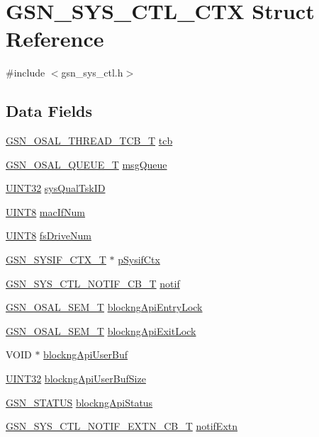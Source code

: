 \hypertarget{a00248}{
\section{GSN\_\-SYS\_\-CTL\_\-CTX Struct Reference}
\label{a00248}
}


{\ttfamily \#include $<$gsn\_\-sys\_\-ctl.h$>$}

\subsection*{Data Fields}
\begin{DoxyCompactItemize}
\item 
\hyperlink{a00628_ga43c1eefe78fa26e478301976f96ac31f}{GSN\_\-OSAL\_\-THREAD\_\-TCB\_\-T} \hyperlink{a00248_afe071d7dcf0fdfb6314fefc4b6f663df}{tcb}
\item 
\hyperlink{a00628_gaebe1c924d01bf6607bd65961bf134095}{GSN\_\-OSAL\_\-QUEUE\_\-T} \hyperlink{a00248_a3525baeed8d9f795ed0c44437f548da2}{msgQueue}
\item 
\hyperlink{a00660_gae1e6edbbc26d6fbc71a90190d0266018}{UINT32} \hyperlink{a00248_a3e06cb8fa58f49b7004a85c6f387ddc7}{sysQualTskID}
\item 
\hyperlink{a00660_gab27e9918b538ce9d8ca692479b375b6a}{UINT8} \hyperlink{a00248_ae57ae92e651751e7978e237c55133b4c}{macIfNum}
\item 
\hyperlink{a00660_gab27e9918b538ce9d8ca692479b375b6a}{UINT8} \hyperlink{a00248_a608e9ec21e3e188328d47a7bba1483ec}{fsDriveNum}
\item 
\hyperlink{a00261}{GSN\_\-SYSIF\_\-CTX\_\-T} $\ast$ \hyperlink{a00248_a48d2f968a8bd5038d7077bf2e4384997}{pSysifCtx}
\item 
\hyperlink{a00253}{GSN\_\-SYS\_\-CTL\_\-NOTIF\_\-CB\_\-T} \hyperlink{a00248_a370ca4360a52490e9882d4057c6acdb8}{notif}
\item 
\hyperlink{a00628_gab4b3554407ce22b940e2fcd3faf5fd47}{GSN\_\-OSAL\_\-SEM\_\-T} \hyperlink{a00248_a1375db10dcc5c2669543b8bdea7c9294}{blockngApiEntryLock}
\item 
\hyperlink{a00628_gab4b3554407ce22b940e2fcd3faf5fd47}{GSN\_\-OSAL\_\-SEM\_\-T} \hyperlink{a00248_ad31b28c2c1d66a49676adefa0939184e}{blockngApiExitLock}
\item 
VOID $\ast$ \hyperlink{a00248_a578079528c6283b8779beb3a12945bf9}{blockngApiUserBuf}
\item 
\hyperlink{a00660_gae1e6edbbc26d6fbc71a90190d0266018}{UINT32} \hyperlink{a00248_ad828642fbf78687924f94c89931c9e13}{blockngApiUserBufSize}
\item 
\hyperlink{a00660_gada5951904ac6110b1fa95e51a9ddc217}{GSN\_\-STATUS} \hyperlink{a00248_a9058d044509dc3901de07c426d816472}{blockngApiStatus}
\item 
\hyperlink{a00254}{GSN\_\-SYS\_\-CTL\_\-NOTIF\_\-EXTN\_\-CB\_\-T} \hyperlink{a00248_a1fe815b73d4c098303ba56581ebf1cd3}{notifExtn}
\end{DoxyCompactItemize}


